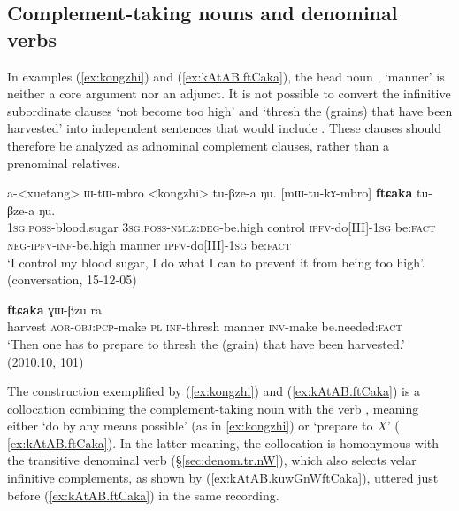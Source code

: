 \subsection{Complement-taking nouns and denominal verbs}  \label{sec:compl.taking.nouns.denominal}
In examples (\ref{ex:kongzhi}) and (\ref{ex:kAtAB.ftCaka}), the head noun , `manner' is neither a core argument nor an adjunct. It is not possible to convert the infinitive subordinate clauses  `not become too high' and  `thresh the (grains) that have been harvested' into independent sentences that would include . These clauses  should therefore be analyzed as adnominal complement clauses, rather than a prenominal relatives.
  
 \begin{exe}
\ex \label{ex:kongzhi}
\gll a-<xuetang> ɯ-tɯ-mbro <kongzhi> tu-βze-a ŋu. [mɯ-tu-kɤ-mbro] \textbf{ftɕaka} tu-βze-a ŋu. \\
  \textsc{1sg}.\textsc{poss}-blood.sugar \textsc{3sg}.\textsc{poss}-\textsc{nmlz}:\textsc{deg}-be.high control \textsc{ipfv}-do[III]-\textsc{1sg} be:\textsc{fact} \textsc{neg}-\textsc{ipfv}-\textsc{inf}-be.high manner \textsc{ipfv}-do[III]-\textsc{1sg} be:\textsc{fact} \\
\glt `I control my blood sugar, I do what I can to prevent it from being too high'. (conversation, 15-12-05)
\end{exe}
  
 \begin{exe}
\ex \label{ex:kAtAB.ftCaka}
 \textbf{ftɕaka} ɣɯ-βzu ra   \\
 harvest \textsc{aor}-\textsc{obj}:\textsc{pcp}-make \textsc{pl} \textsc{inf}-thresh manner \textsc{inv}-make be.needed:\textsc{fact} \\
 \glt `Then one has to prepare to thresh the (grain) that have been harvested.' (2010.10, 101)
\end{exe}
 
The construction exemplified by (\ref{ex:kongzhi}) and (\ref{ex:kAtAB.ftCaka}) is a collocation combining the complement-taking noun  with the verb , meaning either  `do by any means possible' (as in \ref{ex:kongzhi}) or `prepare to $X$' ( \ref{ex:kAtAB.ftCaka}). In the latter meaning, the collocation is  homonymous with the transitive denominal verb  (§\ref{sec:denom.tr.nW}), which also selects velar infinitive complements, as shown by (\ref{ex:kAtAB.kuwGnWftCaka}), uttered just before (\ref{ex:kAtAB.ftCaka}) in the same recording.

